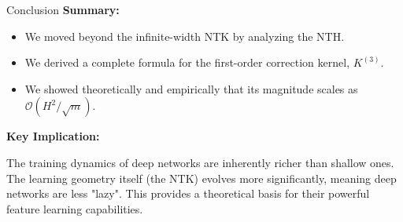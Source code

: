 \documentclass{beamer}
\newcommand{\Order}{\mathcal{O}}
\begin{document}
\begin{frame}{Conclusion}
\textbf{Summary:}
\begin{itemize}
    \item We moved beyond the infinite-width NTK by analyzing the NTH.
    \item We derived a complete formula for the first-order correction kernel, $K^{(3)}$.
    \item We showed theoretically and empirically that its magnitude scales as $\Order(H^2/\sqrt{m})$.
\end{itemize}
\vspace{1cm}
\textbf{Key Implication:}
\begin{alertblock}
The training dynamics of deep networks are inherently richer than shallow ones. The learning geometry itself (the NTK) evolves more significantly, meaning deep networks are less "lazy". This provides a theoretical basis for their powerful feature learning capabilities.
\end{alertblock}
\end{frame}
\end{document}
